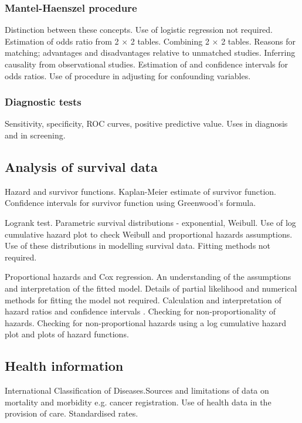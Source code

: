 \subsubsection*{Mantel-Haenszel procedure}
 
Distinction between these concepts.
Use of logistic regression not required.
Estimation of odds ratio from 2 × 2 tables.
Combining 2 × 2 tables.
Reasons for matching; advantages and
disadvantages relative to unmatched studies.
Inferring causality from observational studies.
Estimation of and confidence intervals for odds ratios.
Use of procedure in adjusting for confounding variables.
\subsubsection*{Diagnostic tests}
Sensitivity, specificity, ROC curves, positive predictive value.
Uses in diagnosis and in screening.
 
\subsection*{Analysis of survival data}
Hazard and survivor functions.
Kaplan-Meier estimate of survivor function.
Confidence intervals for survivor function using Greenwood's formula.
 
Logrank test. Parametric survival distributions - exponential, Weibull.
Use of log cumulative hazard plot to check Weibull and proportional hazards assumptions.
Use of these distributions in modelling survival data. Fitting methods not required.
 
Proportional hazards and Cox regression. An understanding of the assumptions and
interpretation of the fitted model. Details of partial likelihood and numerical methods for
fitting the model not required. Calculation and interpretation of hazard ratios and confidence
intervals
.
Checking for non-proportionality of hazards.
Checking for non-proportional hazards using a log cumulative hazard plot and plots of hazard functions.
 
\subsection*{Health information}
International Classification of Diseases.Sources and limitations of data on mortality and
morbidity e.g. cancer registration. Use of health data in the provision of care. Standardised rates.
 
